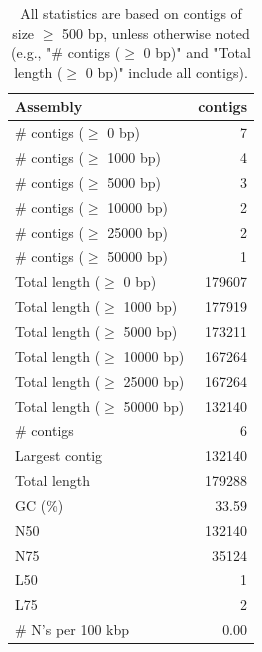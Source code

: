 \documentclass[12pt,a4paper]{article}
\begin{document}
\begin{table}[ht]
\begin{center}
\caption{All statistics are based on contigs of size $\geq$ 500 bp, unless otherwise noted (e.g., "\# contigs ($\geq$ 0 bp)" and "Total length ($\geq$ 0 bp)" include all contigs).}
\begin{tabular}{|l*{1}{|r}|}
\hline
Assembly & contigs \\ \hline
\# contigs ($\geq$ 0 bp) & 7 \\ \hline
\# contigs ($\geq$ 1000 bp) & 4 \\ \hline
\# contigs ($\geq$ 5000 bp) & 3 \\ \hline
\# contigs ($\geq$ 10000 bp) & 2 \\ \hline
\# contigs ($\geq$ 25000 bp) & 2 \\ \hline
\# contigs ($\geq$ 50000 bp) & 1 \\ \hline
Total length ($\geq$ 0 bp) & 179607 \\ \hline
Total length ($\geq$ 1000 bp) & 177919 \\ \hline
Total length ($\geq$ 5000 bp) & 173211 \\ \hline
Total length ($\geq$ 10000 bp) & 167264 \\ \hline
Total length ($\geq$ 25000 bp) & 167264 \\ \hline
Total length ($\geq$ 50000 bp) & 132140 \\ \hline
\# contigs & 6 \\ \hline
Largest contig & 132140 \\ \hline
Total length & 179288 \\ \hline
GC (\%) & 33.59 \\ \hline
N50 & 132140 \\ \hline
N75 & 35124 \\ \hline
L50 & 1 \\ \hline
L75 & 2 \\ \hline
\# N's per 100 kbp & 0.00 \\ \hline
\end{tabular}
\end{center}
\end{table}
\end{document}
